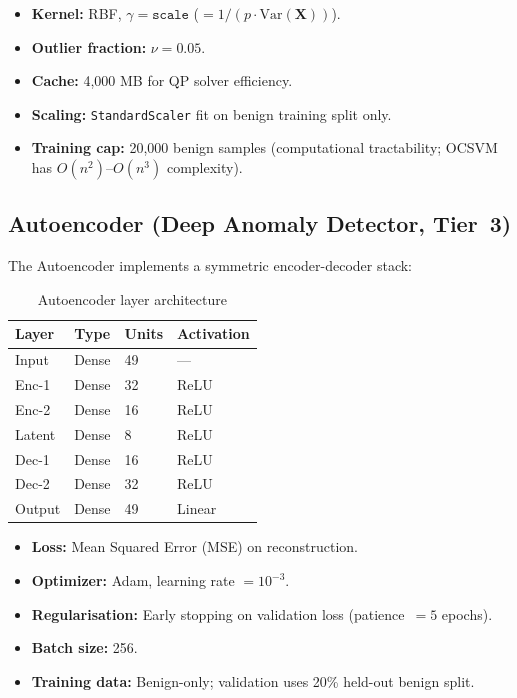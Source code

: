 \documentclass[10pt,conference]{IEEEtran}
\begin{document}
\begin{itemize}[leftmargin=*,noitemsep]
  \item \textbf{Kernel:} RBF, $\gamma = \texttt{scale}$
        ($= 1 / (p \cdot \text{Var}(\mathbf{X}))$).
  \item \textbf{Outlier fraction:} $\nu = 0.05$.
  \item \textbf{Cache:} 4{,}000 MB for QP solver efficiency.
  \item \textbf{Scaling:} \texttt{StandardScaler} fit on benign
        training split only.
  \item \textbf{Training cap:} 20{,}000 benign samples (computational
        tractability; OCSVM has $O(n^2)$–$O(n^3)$ complexity).
\end{itemize}

\subsection{Autoencoder (Deep Anomaly Detector, Tier~3)}

The Autoencoder implements a symmetric encoder-decoder stack:

\begin{table}[H]
\centering
\caption{Autoencoder layer architecture}
\label{tab:ae_arch}
\begin{tabular}{llll}
\toprule
\textbf{Layer} & \textbf{Type} & \textbf{Units} & \textbf{Activation} \\
\midrule
Input    & Dense & 49   & ---  \\
Enc-1    & Dense & 32   & ReLU \\
Enc-2    & Dense & 16   & ReLU \\
Latent   & Dense & 8    & ReLU \\
Dec-1    & Dense & 16   & ReLU \\
Dec-2    & Dense & 32   & ReLU \\
Output   & Dense & 49   & Linear \\
\bottomrule
\end{tabular}
\end{table}

\begin{itemize}[leftmargin=*,noitemsep]
  \item \textbf{Loss:} Mean Squared Error (MSE) on reconstruction.
  \item \textbf{Optimizer:} Adam, learning rate $= 10^{-3}$.
  \item \textbf{Regularisation:} Early stopping on validation loss
        (patience~$= 5$ epochs).
  \item \textbf{Batch size:} 256.
  \item \textbf{Training data:} Benign-only; validation uses 20\%
        held-out benign split.
\end{itemize}
\end{document}
